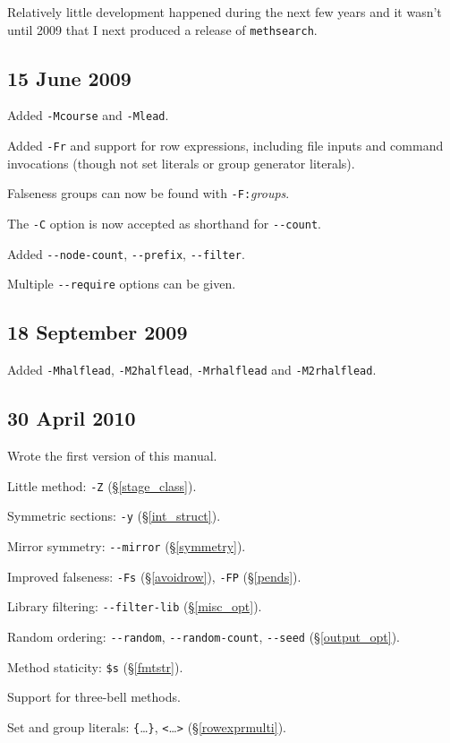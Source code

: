 \documentclass[a4paper,11pt,oneside]{book}
\def\methsearch{\texttt{meth\-search}}
\newcommand{\sref}[1]{\hyperref[#1]{\S\ref{#1}}}
\begin{document}
Relatively little development happened during the next few years 
and it wasn't until 2009 that I next produced a release of \methsearch.

\subsection{15 June 2009}
\begin{list}{}{\leftmargin=1em\itemsep=0em}
\item Added \verb+-Mcourse+ and \verb+-Mlead+.
\item Added \verb+-Fr+ and support for row expressions, including
file inputs and command invocations (though not set literals or group 
generator literals).
\item Falseness groups can now be found with \verb+-F:+\textit{groups}.
\item The \verb+-C+ option is now accepted as shorthand for \verb+--count+.
\item Added \verb+--node-count+, \verb+--prefix+, \verb+--filter+.
\item Multiple \verb+--require+ options can be given.
\end{list}

\subsection{18 September 2009}
\begin{list}{}{\leftmargin=1em\itemsep=0em}
\item Added \verb+-Mhalflead+, \verb+-M2halflead+, \verb+-Mrhalflead+
and \verb+-M2rhalflead+.
\end{list}

\subsection{30 April 2010}
\begin{list}{}{\leftmargin=1em\itemsep=0em}
\item Wrote the first version of this manual.
\item Little method: \verb+-Z+ (\sref{stage_class}).
\item Symmetric sections: \verb+-y+ (\sref{int_struct}).
\item Mirror symmetry: \verb+--mirror+ (\sref{symmetry}).
\item Improved falseness: \verb+-Fs+ (\sref{avoidrow}), 
  \verb+-FP+ (\sref{pends}).
\item Library filtering: \verb+--filter-lib+ (\sref{misc_opt}).
\item Random ordering: \verb+--random+, \verb+--random-count+, \verb+--seed+
  (\S\ref{output_opt}).
\item Method staticity: \verb+$s+ (\sref{fmtstr}).
\item Support for three-bell methods.
\item Set and group literals: \verb+{+\ldots\verb+}+, \verb+<+\ldots\verb+>+
  (\sref{rowexprmulti}).
\end{list}
\end{document}
